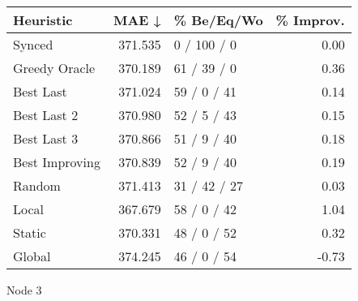 \begin{tabular}{lrlr}
\toprule
\textbf{Heuristic} & \textbf{MAE ↓} & \textbf{\% Be/Eq/Wo} & \textbf{\% Improv.} \\
\midrule
            Synced &        371.535 &          0 / 100 / 0 &                0.00 \\
     Greedy Oracle &        370.189 &          61 / 39 / 0 &                0.36 \\
         Best Last &        371.024 &          59 / 0 / 41 &                0.14 \\
       Best Last 2 &        370.980 &          52 / 5 / 43 &                0.15 \\
       Best Last 3 &        370.866 &          51 / 9 / 40 &                0.18 \\
    Best Improving &        370.839 &          52 / 9 / 40 &                0.19 \\
            Random &        371.413 &         31 / 42 / 27 &                0.03 \\
             Local &        367.679 &          58 / 0 / 42 &                1.04 \\
            Static &        370.331 &          48 / 0 / 52 &                0.32 \\
            Global &        374.245 &          46 / 0 / 54 &               -0.73 \\
\bottomrule
\end{tabular}
\caption{Node 3}
\label{tab:non_lr01_le1_bs2_3}
